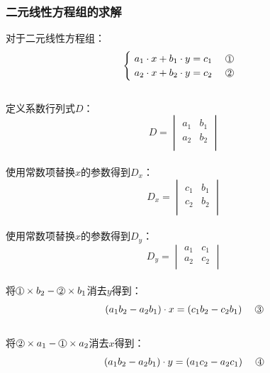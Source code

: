 \documentclass[UTF8]{ctexart}
\newcommand*{\circled}[1]{\lower.7ex\hbox{\tikz\draw (0pt, 0pt)circle (.4em) node {\makebox[0em][c]{\footnotesize #1}};}}
\begin{document}
\subsubsection{二元线性方程组的求解}
    \setcounter{equation}{0}
    对于二元线性方程组：
    \begin{equation}
        \begin{cases}
            ~a_{1}\cdot x+b_{1}\cdot y=c_{1}~~~~\circled{1}\\
            ~a_{2}\cdot x+b_{2}\cdot y=c_{2}~~~~\circled{2}\\
        \end{cases}
    \end{equation}\\
    定义系数行列式$D$：
    \begin{equation}
        D=
        \begin{vmatrix}
            a_1&b_1\\
            a_2&b_2\\    
        \end{vmatrix}
    \end{equation}\\
    使用常数项替换$x$的参数得到$D_x$：
    \begin{equation}
        D_x=
        \begin{vmatrix}
            c_1&b_1\\
            c_2&b_2\\    
        \end{vmatrix}
    \end{equation}\\
    使用常数项替换$x$的参数得到$D_y$：
    \begin{equation}
        D_y=
        \begin{vmatrix}
            a_1&c_1\\
            a_2&c_2\\    
        \end{vmatrix}
    \end{equation}\\
    将$\circled{1}\times b_2-\circled{2}\times b_1$消去$y$得到：
    \begin{equation}
        (a_1b_2-a_2b_1)\cdot x=(c_1b_2-c_2b_1)~~~~\circled{3}
    \end{equation}\\
    将$\circled{2}\times a_1-\circled{1}\times a_2$消去$x$得到：
    \begin{equation}
        (a_1b_2-a_2b_1)\cdot y=(a_1c_2-a_2c_1)~~~~\circled{4}
    \end{equation}\\
\end{document}
